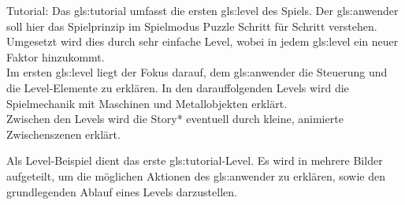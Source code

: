 \documentclass{scrartcl}
\begin{document}
\begin{description}
	
	\begin{minipage}{1\textwidth}
		\item[Tutorial:] \label{Levelaufbau:Tutorial}  Das \gls{gls:tutorial} umfasst die ersten \gls{gls:level} des Spiels. Der \gls{gls:anwender} soll hier das Spielprinzip im Spielmodus Puzzle Schritt für Schritt verstehen.
		Umgesetzt wird dies durch sehr einfache Level, wobei in jedem \gls{gls:level} ein neuer Faktor hinzukommt.\\
		Im ersten \gls{gls:level} liegt der Fokus darauf, dem \gls{gls:anwender} die Steuerung und die Level-Elemente zu erklären. 
		In den darauffolgenden Levels wird die Spielmechanik mit Maschinen und Metallobjekten erklärt.\\
		Zwischen den Levels wird die Story* eventuell durch kleine, animierte Zwischenszenen erklärt.\\		 
	\end{minipage}
		

	\item[Levelbeispiel:] \label{Levelaufbau:Levelbeispiel} Als Level-Beispiel dient das erste \gls{gls:tutorial}-Level. Es wird in mehrere Bilder aufgeteilt, um die möglichen Aktionen des \gls{gls:anwender} zu erklären, sowie den grundlegenden Ablauf eines Levels darzustellen.\\
	

\end{description}
\end{document}
